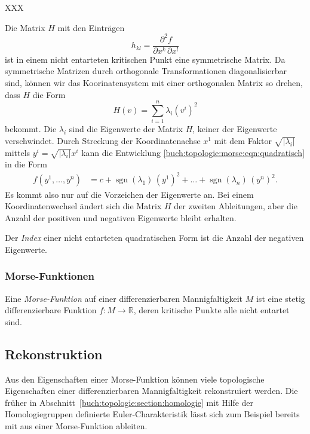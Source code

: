 \begin{definition}
XXX
\end{definition}

Die Matrix $H$ mit den Einträgen
\[
h_{kl} = \frac{\partial^2 f}{\partial x^k\,\partial x^l}
\]
ist in einem nicht entarteten kritischen Punkt eine symmetrische
Matrix.
Da symmetrische Matrizen durch orthogonale Transformationen
diagonalisierbar sind, können wir das Koorinatensystem mit
einer orthogonalen Matrix so drehen, dass $H$ die Form
\[
H(v)
=
\sum_{i=1}^n \lambda_i (v^i)^2
\]
bekommt.
Die $\lambda_i$ sind die Eigenwerte der Matrix $H$, keiner
der Eigenwerte verschwindet.
Durch Streckung der Koordinatenachse $x^1$ mit dem Faktor
$\!\sqrt{|\lambda_i|}$  mittels
$y^i = \!\sqrt{|\lambda_i|}x^i$ kann die Entwicklung
\eqref{buch:topologie:morse:eqn:quadratisch}
in die Form
\begin{align*}
f(y^1,\dots,y^n)
&=
c
+
\operatorname{sgn}(\lambda_1)\,(y^1)^2
+
\dots
+
\operatorname{sgn}(\lambda_n)\,(y^n)^2.
\end{align*}
Es kommt also nur auf die Vorzeichen der Eigenwerte an.
Bei einem Koordinatenwechsel ändert sich die Matrix $H$ der zweiten
Ableitungen, aber die Anzahl der positiven und negativen Eigenwerte
bleibt erhalten.

\begin{definition}[Index]
%
Der \emph{Index} einer nicht entarteten quadratischen Form ist die
Anzahl der negativen Eigenwerte.
\end{definition}

\subsubsection{Morse-Funktionen}

\begin{definition}
%
Eine {\em Morse-Funktion} auf einer differenzierbaren Mannigfaltigkeit
$M$ ist eine stetig differenzierbare Funktion $f\colon M\to\mathbb{R}$,
deren kritische Punkte alle nicht entartet sind.
\end{definition}

%
%
\subsection{Rekonstruktion}
Aus den Eigenschaften einer Morse-Funktion können viele topologische
Eigenschaften einer differenzierbaren Mannigfaltigkeit rekonstruiert
werden.
Die früher in Abschnitt~\ref{buch:topologie:section:homologie}
mit Hilfe der Homologiegruppen definierte Euler-Charakteristik
lässt sich zum Beispiel bereits mit aus einer Morse-Funktion
ableiten.

